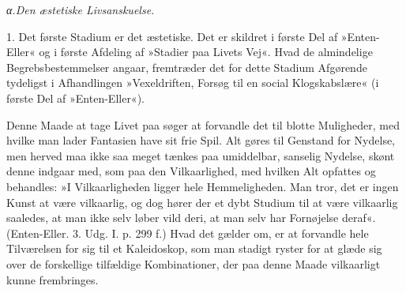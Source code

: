 \documentclass[12pt,a4paper,openany]{book}
\begin{document}
\begin{center}\textit{α.\enspace Den æstetiske Livsanskuelse.}\end{center}

1. Det første Stadium er det æstetiske. Det er
skildret i første Del af »Enten-Eller« og i første Afdeling
af »Stadier paa Livets Vej«. Hvad de almindelige Begrebsbestemmelser
angaar, fremtræder det for dette Stadium
Afgørende tydeligst i Afhandlingen »Vexeldriften,
Forsøg til en social Klogskabslære« (i første Del af
»Enten-Eller«).

Denne Maade at tage Livet paa søger at forvandle
det til blotte Muligheder, med hvilke man lader Fantasien
have sit frie Spil. Alt gøres til Genstand for Nydelse,
men herved maa ikke saa meget tænkes paa umiddelbar,
sanselig Nydelse, skønt denne indgaar med, som paa den
Vilkaarlighed, med hvilken Alt opfattes og behandles:
»I Vilkaarligheden ligger hele Hemmeligheden. Man
tror, det er ingen Kunst at være vilkaarlig, og dog hører
der et dybt Studium til at være vilkaarlig saaledes, at
man ikke selv løber vild deri, at man selv har Fornøjelse
deraf«. (Enten-Eller. 3. Udg. I. p. 299 f.) Hvad det
gælder om, er at forvandle hele Tilværelsen for sig til
et Kaleidoskop, som man stadigt ryster for at glæde sig
over de forskellige tilfældige Kombinationer, der paa
denne Maade vilkaarligt kunne frembringes.
\end{document}
